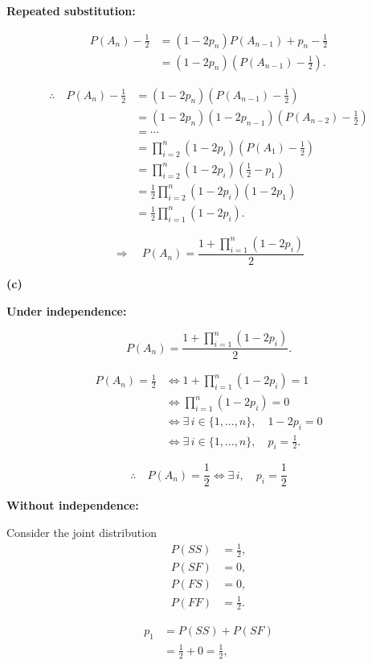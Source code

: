 \documentclass[11pt,a4paper]{article}
\begin{document}
\textbf{Repeated substitution:}

\[
\begin{aligned}
P(A_n)-\frac12
&=(1-2p_n)P(A_{n-1})+p_n-\frac12\\
&=(1-2p_n)\left(P(A_{n-1})-\frac12\right).
\end{aligned}
\]

\[
\begin{aligned}
\therefore\quad P(A_n)-\frac12
&=(1-2p_n)\left(P(A_{n-1})-\frac12\right)\\
&=(1-2p_n)(1-2p_{n-1})
  \left(P(A_{n-2})-\frac12\right)\\
&=\cdots\\
&=\prod_{i=2}^{n}(1-2p_i)
  \left(P(A_1)-\frac12\right)\\
&=\prod_{i=2}^{n}(1-2p_i)
  \left(\frac12-p_1\right)\\
&=\frac12\prod_{i=2}^{n}(1-2p_i)(1-2p_1)\\
&=\frac12\prod_{i=1}^{n}(1-2p_i).
\end{aligned}
\]

\[
\Rightarrow\quad
P(A_n)=
\frac{1+\prod_{i=1}^{n}(1-2p_i)}{2}
\]


\textbf{(c)}

\textbf{Under independence:}

\[
P(A_n)=
\frac{1+\prod_{i=1}^{n}(1-2p_i)}{2}.
\]

\[
\begin{aligned}
P(A_n)=\frac12
&\Longleftrightarrow
1+\prod_{i=1}^{n}(1-2p_i)=1\\
&\Longleftrightarrow
\prod_{i=1}^{n}(1-2p_i)=0\\
&\Longleftrightarrow
\exists\,i\in\{1,\ldots,n\},
\quad 1-2p_i=0\\
&\Longleftrightarrow
\exists\,i\in\{1,\ldots,n\},
\quad p_i=\frac12.
\end{aligned}
\]

\[
\therefore\quad
P(A_n)=\frac12
\Longleftrightarrow
\exists\,i,\quad p_i=\frac12
\]

\textbf{Without independence:}

Consider the joint distribution
\[
\begin{aligned}
P(SS)&=\frac12,\\
P(SF)&=0,\\
P(FS)&=0,\\
P(FF)&=\frac12.
\end{aligned}
\]

\[
\begin{aligned}
p_1
&=P(SS)+P(SF)\\
&=\frac12+0=\frac12,
\end{aligned}
\]
\end{document}
